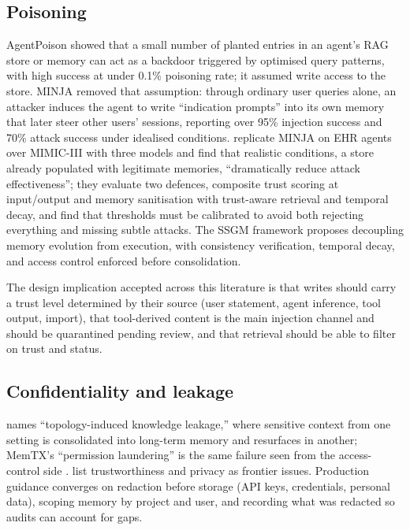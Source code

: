 \documentclass[11pt]{article}
\begin{document}
\subsection{Poisoning}

AgentPoison \citep{chen2024agentpoison} showed that a small number of planted entries in an agent's RAG store or memory can act as a backdoor triggered by optimised query patterns, with high success at under 0.1\% poisoning rate; it assumed write access to the store. MINJA \citep{dong2025minja} removed that assumption: through ordinary user queries alone, an attacker induces the agent to write ``indication prompts'' into its own memory that later steer other users' sessions, reporting over 95\% injection success and 70\% attack success under idealised conditions. \citet{sunil2026poisoning} replicate MINJA on EHR agents over MIMIC-III with three models and find that realistic conditions, a store already populated with legitimate memories, ``dramatically reduce attack effectiveness''; they evaluate two defences, composite trust scoring at input/output and memory sanitisation with trust-aware retrieval and temporal decay, and find that thresholds must be calibrated to avoid both rejecting everything and missing subtle attacks. The SSGM framework \citep{lam2026ssgm} proposes decoupling memory evolution from execution, with consistency verification, temporal decay, and access control enforced before consolidation.

The design implication accepted across this literature is that writes should carry a trust level determined by their source (user statement, agent inference, tool output, import), that tool-derived content is the main injection channel and should be quarantined pending review, and that retrieval should be able to filter on trust and status.

\subsection{Confidentiality and leakage}

\citet{lam2026ssgm} names ``topology-induced knowledge leakage,'' where sensitive context from one setting is consolidated into long-term memory and resurfaces in another; MemTX's ``permission laundering'' is the same failure seen from the access-control side \citep{li2026memtx}. \citet{hu2025memoryage} list trustworthiness and privacy as frontier issues. Production guidance converges on redaction before storage (API keys, credentials, personal data), scoping memory by project and user, and recording what was redacted so audits can account for gaps.
\end{document}

